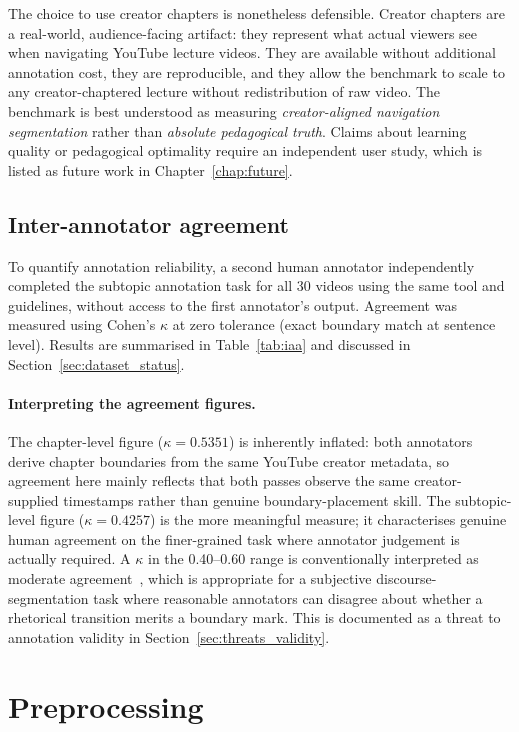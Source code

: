 The choice to use creator chapters is nonetheless defensible.
Creator chapters are a real-world, audience-facing artifact: they represent
what actual viewers see when navigating YouTube lecture videos.
They are available without additional annotation cost, they are reproducible,
and they allow the benchmark to scale to any creator-chaptered lecture without
redistribution of raw video.
The benchmark is best understood as measuring \emph{creator-aligned
navigation segmentation} rather than \emph{absolute pedagogical truth}.
Claims about learning quality or pedagogical optimality require an independent
user study, which is listed as future work in Chapter~\ref{chap:future}.

\subsection{Inter-annotator agreement}
\label{sec:iaa}

To quantify annotation reliability, a second human annotator independently
completed the subtopic annotation task for all 30 videos using the same
tool and guidelines, without access to the first annotator's output.
Agreement was measured using Cohen's $\kappa$ at zero tolerance
(exact boundary match at sentence level). Results are summarised in
Table~\ref{tab:iaa} and discussed in Section~\ref{sec:dataset_status}.

\paragraph{Interpreting the agreement figures.}
The chapter-level figure ($\kappa=0.5351$) is inherently inflated: both
annotators derive chapter boundaries from the same YouTube creator metadata,
so agreement here mainly reflects that both passes observe the same
creator-supplied timestamps rather than genuine boundary-placement skill.
The subtopic-level figure ($\kappa=0.4257$) is the more meaningful measure;
it characterises genuine human agreement on the finer-grained task
where annotator judgement is actually required.
A $\kappa$ in the 0.40--0.60 range is conventionally interpreted as moderate
agreement~\cite{fournier2012}, which is appropriate for a subjective
discourse-segmentation task where reasonable annotators can disagree about
whether a rhetorical transition merits a boundary mark.
This is documented as a threat to annotation validity in
Section~\ref{sec:threats_validity}.

\section{Preprocessing}
\label{sec:preprocess}

